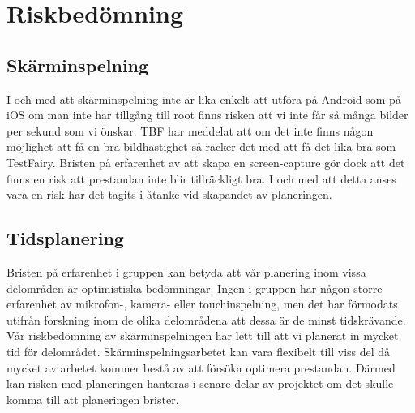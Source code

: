 \section{Riskbedömning}

\subsection{Skärminspelning}
I och med att skärminspelning inte är lika enkelt att utföra på Android som på iOS om man inte har tillgång till root finns risken att vi inte får så många bilder per sekund som vi önskar. TBF har meddelat att om det inte finns någon möjlighet att få en bra bildhastighet så räcker det med att få det lika bra som TestFairy. Bristen på erfarenhet av att skapa en screen-capture gör dock att det finns en risk att prestandan inte blir tillräckligt bra. I och med att detta anses vara en risk har det tagits i åtanke vid skapandet av planeringen.

\subsection{Tidsplanering}
Bristen på erfarenhet i gruppen kan betyda att vår planering inom vissa delområden är optimistiska bedömningar. Ingen i gruppen har någon större erfarenhet av mikrofon-, kamera- eller touchinspelning, men det har förmodats utifrån forskning inom de olika delområdena att dessa är de minst tidskrävande. Vår riskbedömning av skärminspelningen har lett till att vi planerat in mycket tid för delområdet. Skärminspelningsarbetet kan vara flexibelt till viss del då mycket av arbetet kommer bestå av att försöka optimera prestandan. Därmed kan risken med planeringen hanteras i senare delar av projektet om det skulle komma till att planeringen brister.
